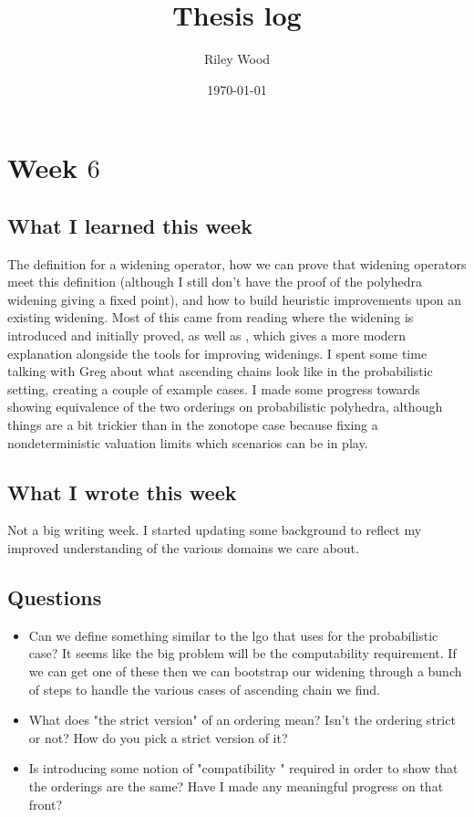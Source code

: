 \documentclass{amsart}
\title{Thesis log}
\author{Riley Wood}
\date{\today}
\begin{document}
\maketitle
\section{Week $6$}

\subsection{What I learned this week}
The definition for a widening operator, how we can prove that widening operators meet this definition (although I still don't have the proof of the polyhedra widening giving a fixed point), and how to build heuristic improvements upon an existing widening.
Most of this came from reading \cite{CousotLinearRestraints} where the widening is introduced and initially proved, as well as \cite{PreciseWidening}, which gives a more modern explanation alongside the tools for improving widenings.
I spent some time talking with Greg about what ascending chains look like in the probabilistic setting, creating a couple of example cases.
I made some progress towards showing equivalence of the two orderings on probabilistic polyhedra, although things are a bit trickier than in the zonotope case because fixing a nondeterministic valuation limits which scenarios can be in play.

\subsection{What I wrote this week}
Not a big writing week. 
I started updating some background to reflect my improved understanding of the various domains we care about.

\subsection{Questions}
\begin{itemize}
  \item Can we define something similar to the lgo that \cite{PreciseWidening} uses for the probabilistic case? It seems like the big problem will be the computability requirement. If we can get one of these then we can bootstrap our widening through a bunch of steps to handle the various cases of ascending chain we find.
  \item What does "the strict version" of an ordering mean? Isn't the ordering strict or not? How do you pick a strict version of it?
  \item Is introducing some notion of "compatibility " required in order to show that the orderings are the same? Have I made any meaningful progress on that front?
\end{itemize}
\end{document}
